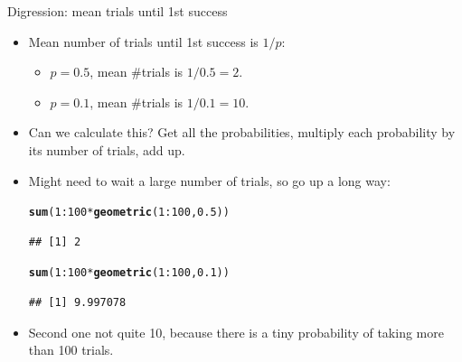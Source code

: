 \documentclass[unknownkeysallowed]{beamer}\usepackage[]{graphicx}\usepackage[]{color}
\makeatletter
\newcommand{\hlnum}[1]{\textcolor[rgb]{0.686,0.059,0.569}{#1}}%
\newcommand{\hlopt}[1]{\textcolor[rgb]{0,0,0}{#1}}%
\newcommand{\hlstd}[1]{\textcolor[rgb]{0.345,0.345,0.345}{#1}}%
\newcommand{\hlkwd}[1]{\textcolor[rgb]{0.737,0.353,0.396}{\textbf{#1}}}%
\newenvironment{kframe}{%
 \def\at@end@of@kframe{}%
 \ifinner\ifhmode%
  \def\at@end@of@kframe{\end{minipage}}%
  \begin{minipage}{\columnwidth}%
 \fi\fi%
 \def\FrameCommand##1{\hskip\@totalleftmargin \hskip-\fboxsep
 \colorbox{shadecolor}{##1}\hskip-\fboxsep
     \hskip-\linewidth \hskip-\@totalleftmargin \hskip\columnwidth}%
 \MakeFramed {\advance\hsize-\width
   \@totalleftmargin\z@ \linewidth\hsize
   \@setminipage}}%
 {\par\unskip\endMakeFramed%
 \at@end@of@kframe}
\newenvironment{knitrout}{}{} %
\makeatother
\begin{document}
\begin{frame}[fragile]{Digression: mean trials until 1st success}
  
  \begin{itemize}
\item Mean number of trials until 1st success is
  $1/p$:
  \begin{itemize}
  \item $p=0.5$, mean \#trials is $1/0.5=2$.
  \item $p=0.1$, mean \#trials is $1/0.1=10$.
  \end{itemize}
  
  \item Can we calculate this? Get all the probabilities, multiply
    each probability by its number of trials, add up.
  \item Might need to wait a large number of trials, so go up a long way:
    
\begin{knitrout}
\color{fgcolor}\begin{kframe}
\begin{alltt}
\hlkwd{sum}\hlstd{(}\hlnum{1}\hlopt{:}\hlnum{100}\hlopt{*}\hlkwd{geometric}\hlstd{(}\hlnum{1}\hlopt{:}\hlnum{100}\hlstd{,}\hlnum{0.5}\hlstd{))}
\end{alltt}
\begin{verbatim}
## [1] 2
\end{verbatim}
\begin{alltt}
\hlkwd{sum}\hlstd{(}\hlnum{1}\hlopt{:}\hlnum{100}\hlopt{*}\hlkwd{geometric}\hlstd{(}\hlnum{1}\hlopt{:}\hlnum{100}\hlstd{,}\hlnum{0.1}\hlstd{))}
\end{alltt}
\begin{verbatim}
## [1] 9.997078
\end{verbatim}
\end{kframe}
\end{knitrout}
\item Second one not quite 10, because there is a tiny probability of
  taking more than 100 trials.
  \end{itemize}
  
\end{frame}
\end{document}
